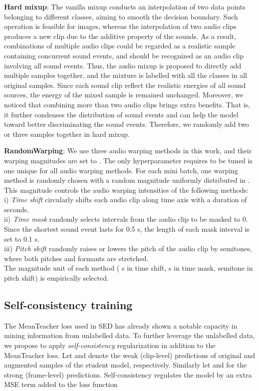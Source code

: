 \documentclass[a4paper]{article}
\begin{document}
\textbf{Hard mixup}: The vanilla mixup \cite{zhang2017mixup} conducts an interpolation of two data points belonging to different classes, aiming to smooth the decision boundary. Such operation is feasible for images, whereas the interpolation of two audio clips produces a new clip due to the additive property of the sounds. As a result, combinations of multiple audio clips could be regarded as a realistic sample containing concurrent sound events, and should be recognized as an audio clip involving all sound events. Thus, the audio mixup is proposed to directly add multiple samples together, and the mixture is labelled with all the classes in all original samples. Since each sound clip reflect the realistic energies of all sound sources, the energy of the mixed sample is remained unchanged. Moreover, we noticed that combining more than two audio clips brings extra benefits. That is, it further condenses the distribution of sound events and can help the model toward better discriminating the sound events. Therefore, we randomly add two or three samples together in hard mixup.

\textbf{RandomWarping}: We use three audio warping methods in this work, and their warping magnitudes are set to . The only hyperparameter requires to be tuned is one unique  for all audio warping methods. For each mini batch, one warping method is randomly chosen with a random magnitude  uniformly distributed in . This magnitude controls the audio warping intensities of the following methods: \\
\indent i) \textit{Time shift} \cite{koh2021sound} circularly shifts each audio clip along time axis with a duration of  seconds. \\
\indent ii) \textit{Time mask} \cite{park2019specaugment} randomly selects  intervals from the audio clip to be masked to 0. Since the shortest sound event lasts for 0.5 s, the length of each mask interval is set to 0.1 s. \\
\indent iii) \textit{Pitch shift} \cite{mcfee2015software} randomly raises or lowers the pitch of the audio clip by  semitones, where both pitches and formants are stretched. \\
The magnitude unit of each method ( s in time shift,  s in time mask,  semitone in pitch shift) is empirically selected.

\subsection{Self-consistency training}
The MeanTeacher loss \cite{tarvainen2017mean} used in SED \cite{jiakai2018mean} has already shown a notable capacity in mining information from unlabelled data. To further leverage the unlabelled data, we propose to apply \emph{self-consistency} regularization in addition to the MeanTeacher loss. Let  and  denote the weak (clip-level) predictions of original and augmented samples of the student model, respectively. Similarly let  and  for the strong (frame-level) predictions. Self-consistency regulates the model by an extra MSE term added to the loss function
\end{document}
